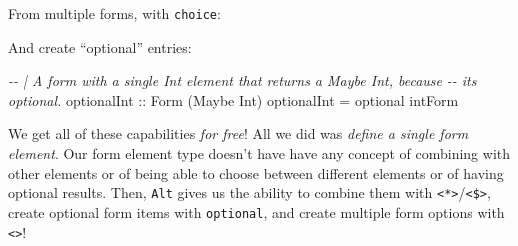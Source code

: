 \documentclass[]{article}
\newenvironment{Shaded}{}{}
\newcommand{\CommentTok}[1]{\textcolor[rgb]{0.38,0.63,0.69}{\textit{#1}}}
\newcommand{\DataTypeTok}[1]{\textcolor[rgb]{0.56,0.13,0.00}{#1}}
\newcommand{\FunctionTok}[1]{\textcolor[rgb]{0.02,0.16,0.49}{#1}}
\newcommand{\NormalTok}[1]{#1}
\newcommand{\OperatorTok}[1]{\textcolor[rgb]{0.40,0.40,0.40}{#1}}
\newcommand{\OtherTok}[1]{\textcolor[rgb]{0.00,0.44,0.13}{#1}}
\begin{document}
From multiple forms, with \texttt{choice}:

\begin{Shaded}
\end{Shaded}

And create ``optional'' entries:

\begin{Shaded}
\begin{Highlighting}[]
\CommentTok{{-}{-} | A form with a single \textquotesingle{}Int\textquotesingle{} element that returns a \textquotesingle{}Maybe Int\textquotesingle{}, because}
\CommentTok{{-}{-} it\textquotesingle{}s optional.}
\OtherTok{optionalInt ::} \DataTypeTok{Form}\NormalTok{ (}\DataTypeTok{Maybe} \DataTypeTok{Int}\NormalTok{)}
\NormalTok{optionalInt }\OtherTok{=}\NormalTok{ optional intForm}
\end{Highlighting}
\end{Shaded}

We get all of these capabilities \emph{for free}! All we did was \emph{define a
single form element}. Our form element type doesn't have have any concept of
combining with other elements or of being able to choose between different
elements or of having optional results. Then, \texttt{Alt} gives us the ability
to combine them with
\texttt{\textless{}*\textgreater{}}/\texttt{\textless{}\$\textgreater{}}, create
optional form items with \texttt{optional}, and create multiple form options
with \texttt{\textless{}\textbar{}\textgreater{}}!
\end{document}
